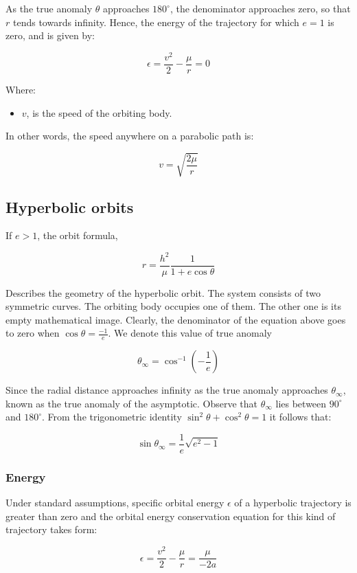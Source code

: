 \documentclass[12pt]{article}
\begin{document}
As the true anomaly \(\theta\) approaches \(180^{\circ}\), the denominator approaches zero, so that \(r\) tends towards infinity. Hence, the energy of the trajectory for which \(e=1\) is zero, and is given by:

\[\epsilon=\frac{v^2}{2}-\frac{\mu}{r}=0\]

Where:

\begin{itemize}
  \item \(v\), is the speed of the orbiting body.
\end{itemize}

In other words, the speed anywhere on a parabolic path is:

\[v=\sqrt{\frac{2\mu}{r}}\]

\subsection{Hyperbolic orbits}

If \(e>1\), the orbit formula,

\[r=\frac{h^2}{\mu}\frac{1}{1+e\cos\theta}\]

Describes the geometry of the hyperbolic orbit. The system consists of two symmetric curves. The orbiting body occupies one of them. The other one is its empty mathematical image. Clearly, the denominator of the equation above goes to zero when \(\cos\theta=\frac{-1}{e}\). We denote this value of true anomaly

\[\theta_{\infty}=\cos^{-1}\left(-{\frac{1}{e}}\right)\]

Since the radial distance approaches infinity as the true anomaly approaches \(\theta_{\infty}\), known as the true anomaly of the asymptotic. Observe that \(\theta_{\infty}\) lies between \(90^{\circ}\) and \(180^{\circ}\). From the trigonometric identity \(\sin^{2}\theta+\cos^{2}\theta=1\) it follows that:

\[\sin\theta_{\infty}=\frac{1}{e}\sqrt{e^{2}-1}\]

\subsubsection{Energy}

Under standard assumptions, specific orbital energy \(\epsilon\) of a hyperbolic trajectory is greater than zero and the orbital energy conservation equation for this kind of trajectory takes form:

\[\epsilon=\frac{v^2}{2}-\frac{\mu}{r}=\frac{\mu}{-2a}\]
\end{document}

